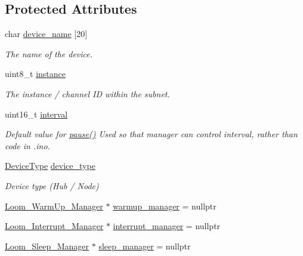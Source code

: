 \subsection*{Protected Attributes}
\begin{DoxyCompactItemize}
\item 
char \hyperlink{class_loom_manager_aac06e8c17477ab5d8991e782f9ffecca}{device\+\_\+name} \mbox{[}20\mbox{]}
\begin{DoxyCompactList}\small\item\em The name of the device. \end{DoxyCompactList}\item 
uint8\+\_\+t \hyperlink{class_loom_manager_af2ce718d7f1d10bdd48344acabf47488}{instance}
\begin{DoxyCompactList}\small\item\em The instance / channel ID within the subnet. \end{DoxyCompactList}\item 
uint16\+\_\+t \hyperlink{class_loom_manager_af5742e2169b750d8b4221778e5c9f629}{interval}
\begin{DoxyCompactList}\small\item\em Default value for \hyperlink{class_loom_manager_a3e57c97dd28717002cf11a1cff794239}{pause()} Used so that manager can control interval, rather than code in .ino. \end{DoxyCompactList}\item 
\hyperlink{class_loom_manager_a23170d165993ad196a7604fd08b29400}{Device\+Type} \hyperlink{class_loom_manager_af280305895cc3b2c5022d4a5fabeb2c4}{device\+\_\+type}
\begin{DoxyCompactList}\small\item\em Device type (Hub / Node) \end{DoxyCompactList}\item 
\hyperlink{class_loom___warm_up___manager}{Loom\+\_\+\+Warm\+Up\+\_\+\+Manager} $\ast$ \hyperlink{class_loom_manager_aa5ef4bac083e23282de91ad886ee5c7d}{warmup\+\_\+manager} = nullptr
\item 
\hyperlink{class_loom___interrupt___manager}{Loom\+\_\+\+Interrupt\+\_\+\+Manager} $\ast$ \hyperlink{class_loom_manager_a9e706e9a8e7acdd2a92ef77121921a0c}{interrupt\+\_\+manager} = nullptr
\item 
\hyperlink{class_loom___sleep___manager}{Loom\+\_\+\+Sleep\+\_\+\+Manager} $\ast$ \hyperlink{class_loom_manager_a2c63f985019cf7ee5766ab503cd7f562}{sleep\+\_\+manager} = nullptr
\item 

\end{DoxyCompactItemize}

